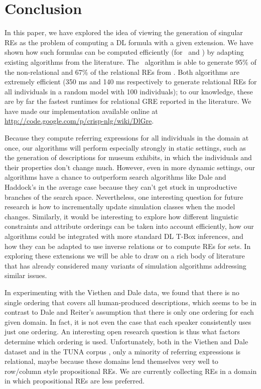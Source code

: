 \section{Conclusion} \label{sec:conclusion}

In this paper, we have explored the idea of viewing the generation of
singular REs as the problem of computing a DL formula with a given
extension.  We have shown how such formulas can be computed
efficiently (for \alc\ and \el) by adapting existing algorithms from
the literature.  The \el\ algorithm is able to generate 95\% of the
non-relational and 67\% of the relational REs from
.  Both algorithms
are extremely efficient (350 ms and 140 ms respectively to generate
relational REs for all individuals in a random model with 100
individuals); to our knowledge, these are by far the fastest runtimes
for relational GRE reported in the literature.  We have made our
implementation available online at
\url{http://code.google.com/p/crisp-nlg/wiki/DlGre}.

Because they compute referring expressions for all individuals in the
domain at once, our algorithms will perform especially strongly in
static settings, such as the generation of descriptions for museum
exhibits, in which the individuals and their properties don't change
much.  However, even in more dynamic settings, our algorithms have a
chance to outperform search algorithms like Dale and Haddock's in the
average case because they can't get stuck in unproductive branches of
the search space. Nevertheless, one interesting question for future
research is how to incrementally update simulation classes when the
model changes. Similarly, it would be interesting to explore how
different linguistic constraints and attribute orderings can be taken
into account efficiently, how our algorithms
could be integrated with more standard DL T-Box inferences, and how they
 can be adapted to use inverse relations or to compute REs
for sets. In exploring these extensions we will be able to draw on a
rich body of literature that has already considered many variants of simulation
algorithms addressing similar issues.

In experimenting with the Viethen and Dale data, we found that there
is no single ordering that covers all human-produced descriptions,
which seems to be in contrast to Dale and Reiter's
 assumption that there is only one ordering for
each given domain.  In fact, it is not even the case that each speaker
consistently uses just one ordering.  An interesting open research
question is thus what factors determine which ordering is used.
Unfortunately, both in the Viethen and Dale dataset and in the TUNA
corpus \cite{deemter06:_build_seman_trans_corpus_for}, only a minority
of referring expressions is relational, maybe because these domains
lend themselves very well to row/column style propositional REs.  We
are currently collecting REs in a domain in which propositional REs
are less preferred.




